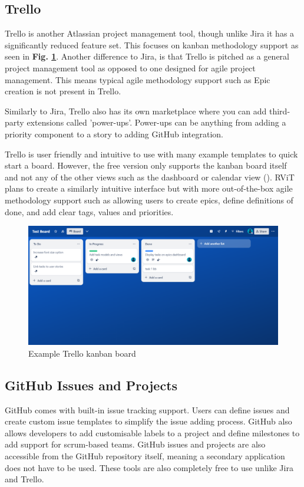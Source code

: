 \documentclass[l4proj.tex]{subfiles}
\begin{document}
\subsection{Trello}
Trello is another Atlassian project management tool, though unlike Jira it has a significantly reduced feature set. This focuses on kanban methodology support as seen in \textbf{Fig. \ref{fig:Trello kanban}}. Another difference to Jira, is that Trello is pitched as a general project management tool as opposed to one designed for agile project management. This means typical agile methodology support such as Epic creation is not present in Trello.

Similarly to Jira, Trello also has its own marketplace where you can add third-party extensions called 'power-ups'. Power-ups can be anything from adding a priority component to a story to adding GitHub integration.

Trello is user friendly and intuitive to use with many example templates to quick start a board. However, the free version only supports the kanban board itself and not any of the other views such as the dashboard or calendar view (\cite{TrelloPricing}). RViT plans to create a similarly intuitive interface but with more out-of-the-box agile methodology support such as allowing users to create epics, define definitions of done, and add clear tags, values and priorities.


\begin{figure}[h!]
\begin{center}
\includegraphics[scale=0.27]{dissertation/images/TrelloKanbanBoard.png}
\caption{Example Trello kanban board}
\label{fig:Trello kanban} 
\end{center}
\end{figure}

\subsection{GitHub Issues and Projects}
GitHub comes with built-in issue tracking support. Users can define issues and create custom issue templates to simplify the issue adding process. GitHub also allows developers to add customisable labels to a project and define milestones to add support for scrum-based teams. GitHub issues and projects are also accessible from the GitHub repository itself, meaning a secondary application does not have to be used. These tools are also completely free to use unlike Jira and Trello.
\end{document}
